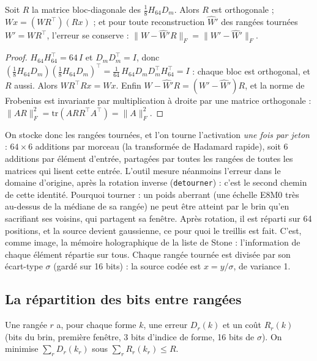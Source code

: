 \begin{proposition}\label{t3gen:prop:rotation}
Soit $R$ la matrice bloc-diagonale des $\frac18 H_{64} D_m$. Alors $R$ est orthogonale ; $Wx = (WR^\top)(Rx)$ ; et pour toute reconstruction $\hat W' $ des rangées tournées $W' = WR^\top$, l'erreur se conserve : $\|W - \hat W' R\|_F = \|W' - \hat W'\|_F$.
\end{proposition}

\begin{proof}
$H_{64} H_{64}^\top = 64\, I$ et $D_m D_m^\top = I$, donc $(\frac18 H_{64} D_m)(\frac18 H_{64} D_m)^\top = \frac{1}{64}\, H_{64} D_m D_m^\top H_{64}^\top = I$ : chaque bloc est orthogonal, et $R$ aussi. Alors $W R^\top R x = W x$. Enfin $W - \hat W' R = (W' - \hat W') R$, et la norme de Frobenius est invariante par multiplication à droite par une matrice orthogonale : $\|AR\|_F^2 = \mathrm{tr}(A R R^\top A^\top) = \|A\|_F^2$.
\end{proof}

On stocke donc les rangées tournées, et l'on tourne l'activation \emph{une fois par jeton} : $64 \times 6$ additions par morceau (la transformée de Hadamard rapide), soit 6 additions par élément d'entrée, partagées par toutes les rangées de toutes les matrices qui lisent cette entrée. L'outil mesure néanmoins l'erreur dans le domaine d'origine, après la rotation inverse (\texttt{detourner}) : c'est le second chemin de cette identité. Pourquoi tourner : un poids aberrant (une échelle E8M0 très au-dessus de la médiane de sa rangée) ne peut être atteint par le brin qu'en sacrifiant ses voisins, qui partagent sa fenêtre. Après rotation, il est réparti sur 64 positions, et la source devient gaussienne, ce pour quoi le treillis est fait. C'est, comme image, la mémoire holographique de la liste de Stone : l'information de chaque élément répartie sur tous. Chaque rangée tournée est divisée par son écart-type $\sigma$ (gardé sur 16 bits) : la source codée est $x = y/\sigma$, de variance 1.

\subsection{La répartition des bits entre rangées}

Une rangée $r$ a, pour chaque forme $k$, une erreur $D_r(k)$ et un coût $R_r(k)$ (bits du brin, première fenêtre, 3 bits d'indice de forme, 16 bits de $\sigma$). On minimise $\sum_r D_r(k_r)$ sous $\sum_r R_r(k_r) \le R$.

